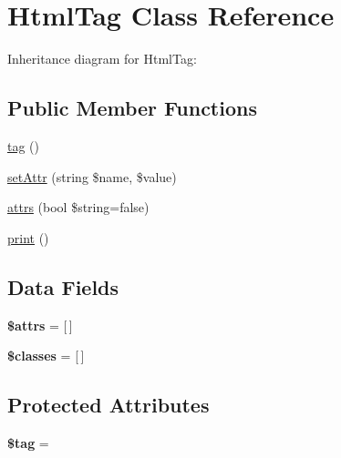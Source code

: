 \hypertarget{class_html_1_1_html_tag}{}\section{Html\+Tag Class Reference}
\label{class_html_1_1_html_tag}


Inheritance diagram for Html\+Tag\+:
\subsection*{Public Member Functions}
\begin{DoxyCompactItemize}
\item 
\hyperlink{class_html_1_1_html_tag_ab2972fb46953f5babb049c5f1c664512}{tag} ()
\item 
\hyperlink{class_html_1_1_html_tag_a80b8713959c19499c9a177d883a5a96b}{set\+Attr} (string \$name, \$value)
\item 
\hyperlink{class_html_1_1_html_tag_a75ef0c456595eaa6a574c438803fb072}{attrs} (bool \$string=false)
\item 
\hyperlink{class_html_1_1_html_tag_a43374e600f552e0a9308ab96b1964aba}{print} ()
\end{DoxyCompactItemize}
\subsection*{Data Fields}
\begin{DoxyCompactItemize}
\item 
\mbox{\label{class_html_1_1_html_tag_af4cf24d99d068a1aefe99caf8dd8a458}} 
{\bfseries \$attrs} = \mbox{[}$\,$\mbox{]}
\item 
\mbox{\label{class_html_1_1_html_tag_a4212f1eca3e4faf764728d56bc13dfd3}} 
{\bfseries \$classes} = \mbox{[}$\,$\mbox{]}
\end{DoxyCompactItemize}
\subsection*{Protected Attributes}
\begin{DoxyCompactItemize}
\item 
\mbox{\label{class_html_1_1_html_tag_a81d5015d41ed8ec66e9db8cdc5db9555}} 
{\bfseries \$tag} = \textquotesingle{}\textquotesingle{}
\end{DoxyCompactItemize}


